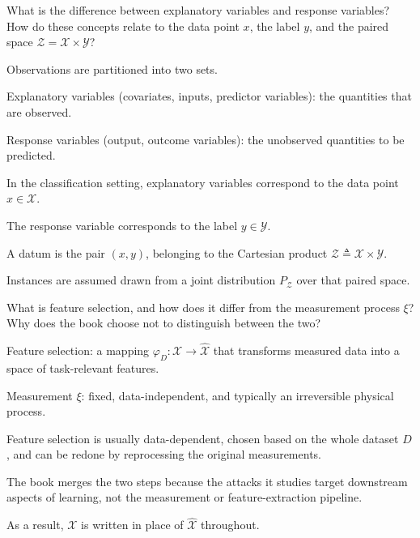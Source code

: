 \documentclass[10pt]{extarticle}
\newcommand{\resposta}[1]{\par\smallskip\noindent #1}
\begin{document}
\begin{questoes}
\item What is the difference between explanatory variables and response variables? How do these concepts relate to the data point $x$, the label $y$, and the paired space $\mathcal{Z} = \mathcal{X} \times \mathcal{Y}$?

\resposta{
\begin{topicos}
\item Observations are partitioned into two sets.
\item Explanatory variables (covariates, inputs, predictor variables): the quantities that are observed.
\item Response variables (output, outcome variables): the unobserved quantities to be predicted.
\item In the classification setting, explanatory variables correspond to the data point $x \in \mathcal{X}$.
\item The response variable corresponds to the label $y \in \mathcal{Y}$.
\item A datum is the pair $(x,y)$, belonging to the Cartesian product $\mathcal{Z} \triangleq \mathcal{X} \times \mathcal{Y}$.
\item Instances are assumed drawn from a joint distribution $P_{\mathcal{Z}}$ over that paired space.
\end{topicos}
}

\item What is feature selection, and how does it differ from the measurement process $\xi$? Why does the book choose not to distinguish between the two?

\resposta{
\begin{topicos}
\item Feature selection: a mapping $\varphi_D: \mathcal{X} \to \hat{\mathcal{X}}$ that transforms measured data into a space of task-relevant features.
\item Measurement $\xi$: fixed, data-independent, and typically an irreversible physical process.
\item Feature selection is usually data-dependent, chosen based on the whole dataset $D$, and can be redone by reprocessing the original measurements.
\item The book merges the two steps because the attacks it studies target downstream aspects of learning, not the measurement or feature-extraction pipeline.
\item As a result, $\mathcal{X}$ is written in place of $\hat{\mathcal{X}}$ throughout.
\end{topicos}
}


\end{questoes}
\end{document}
